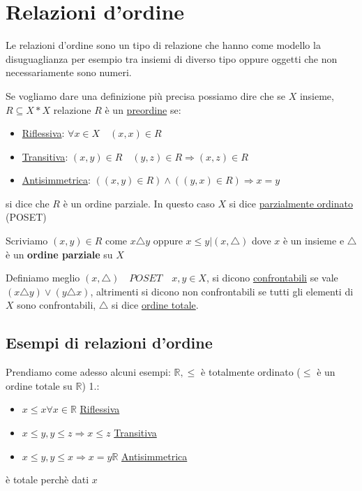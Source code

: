 \documentclass{article}
\begin{document}
\newpage
\section{Relazioni d'ordine}
Le relazioni d'ordine sono un tipo di relazione che hanno come modello la disuguaglianza per esempio tra insiemi di diverso tipo oppure oggetti che non necessariamente sono numeri. \par
Se vogliamo dare una definizione più precisa possiamo dire che se $ X $  insieme, $ R \subseteq X * X $ relazione $ R $ è un \underline{preordine} se:
\begin{itemize}
        \item \underline{Riflessiva}: $ \forall x \in X \quad (x,x) \in R$ 
        \item \underline{Transitiva}: $ (x,y) \in R \quad (y,z)  \in R \Rightarrow (x,z) \in R$ 
        \item \underline{Antisimmetrica}: $ ((x,y) \in R) \land ((y,x) \in R) \Rightarrow x = y $ 
\end{itemize}

si dice che $ R $ è un ordine parziale. \newline
In questo caso $ X $ si dice \underline{parzialmente ordinato} (POSET) \par
Scriviamo $ (x,y) \in R $ come $ x \triangle y $ oppure $ x \le y | (x, \triangle)$  dove $x$ è un insieme e $ \triangle $ è un \textbf{ordine parziale} su $ X $    

Definiamo meglio $ (x, \triangle) \quad  POSET \quad x,y \in X$, si dicono \underline{confrontabili} se vale $ (x \triangle y) \lor (y \triangle x) $, altrimenti si dicono non confrontabili  se tutti gli elementi di $ X $ sono confrontabili, $ \triangle $ si dice \underline{ordine totale}.  \par

\subsection{Esempi di relazioni d'ordine}
Prendiamo come adesso alcuni esempi: \newline 
$ \mathbb{R}, \le $ è totalmente ordinato ($ \le $ è un ordine totale su $ \mathbb{R} $) 1.:
\begin{itemize}
        \item $ x \le x \forall x \in \mathbb{R} $ \underline{Riflessiva}
        \item $ x \le y, y \le z \Rightarrow x \le z$ \underline{Transitiva}
        \item $ x \le y, y \le x \Rightarrow x=y  \mathbb{R} $ \underline{Antisimmetrica}
\end{itemize}
è totale perchè dati $ x $ \newline
\end{document}
